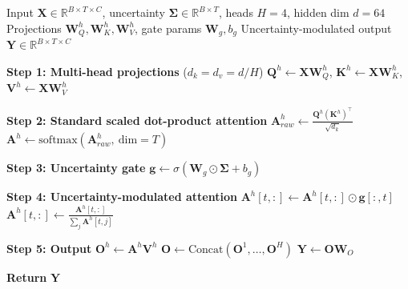 \begin{algorithm}[H]
\footnotesize
\caption{Adaptive Uncertainty-Aware Attention (AUAA)}
\label{alg:auaa}
\begin{algorithmic}
\Require Input $\mathbf{X} \in \mathbb{R}^{B \times T \times C}$, uncertainty $\boldsymbol{\Sigma} \in \mathbb{R}^{B \times T}$, heads $H=4$, hidden dim $d=64$
\Require Projections $\mathbf{W}_Q^h, \mathbf{W}_K^h, \mathbf{W}_V^h$, gate params $\mathbf{W}_g, b_g$
\Ensure Uncertainty-modulated output $\mathbf{Y} \in \mathbb{R}^{B \times T \times C}$

\State \textbf{Step 1: Multi-head projections} ($d_k = d_v = d/H$)
    \State $\mathbf{Q}^h \gets \mathbf{X} \mathbf{W}_Q^h$, \quad $\mathbf{K}^h \gets \mathbf{X} \mathbf{W}_K^h$, \quad $\mathbf{V}^h \gets \mathbf{X} \mathbf{W}_V^h$
\EndFor

\State \textbf{Step 2: Standard scaled dot-product attention}
    \State $\mathbf{A}^h_{raw} \gets \frac{\mathbf{Q}^h (\mathbf{K}^h)^{\!\top}}{\sqrt{d_k}}$
    \State $\mathbf{A}^h \gets \text{softmax}(\mathbf{A}^h_{raw},\ \text{dim}=T)$
\EndFor

\State \textbf{Step 3: Uncertainty gate}
\State $\mathbf{g} \gets \sigma(\mathbf{W}_g \odot \boldsymbol{\Sigma} + b_g)$ 

\State \textbf{Step 4: Uncertainty-modulated attention}
        \State $\mathbf{A}^h[t,:] \gets \mathbf{A}^h[t,:] \odot \mathbf{g}[:,t]$
        \State $\mathbf{A}^h[t,:] \gets \frac{\mathbf{A}^h[t,:]}{\sum_j \mathbf{A}^h[t,j]}$ 
    \EndFor
\EndFor

\State \textbf{Step 5: Output}
    \State $\mathbf{O}^h \gets \mathbf{A}^h \mathbf{V}^h$
\EndFor
\State $\mathbf{O} \gets \text{Concat}(\mathbf{O}^1, \dots, \mathbf{O}^H)$
\State $\mathbf{Y} \gets \mathbf{O} \mathbf{W}_O$

\State \textbf{Return} $\mathbf{Y}$
\end{algorithmic}
\end{algorithm}
